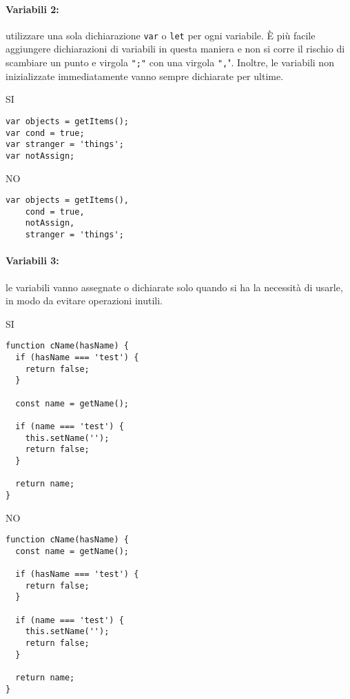 \documentclass[../ProcessiPrimari.tex]{subfiles}
\begin{document}
\paragraph{Variabili 2:}utilizzare una sola dichiarazione \texttt{var} o \texttt{let} per ogni variabile. È più facile aggiungere dichiarazioni di variabili in questa maniera e non si corre il rischio di scambiare un punto e virgola \texttt{";"} con una virgola \texttt{",}". Inoltre, le variabili non inizializzate immediatamente vanno sempre dichiarate per ultime.

\begin{center}{
\begin{minipage}{6cm}
	{\begin{center}SI\end{center}}
	\begin{Verbatim}[frame=single]
var objects = getItems();
var cond = true;
var stranger = 'things';
var notAssign;
	\end{Verbatim}
\end{minipage}
\hfil
\begin{minipage}{6.5cm}
	{\begin{center}NO\end{center}}
	\begin{Verbatim}[frame=single]
var objects = getItems(),
	cond = true,
	notAssign,
	stranger = 'things';
	\end{Verbatim}
\end{minipage}
}
\end{center}

\paragraph{Variabili 3:}le variabili vanno assegnate o dichiarate solo quando si ha la necessità di usarle, in modo da evitare operazioni inutili.
\begin{center}{
\begin{minipage}{6cm}
	{\begin{center}SI\end{center}}
	\begin{Verbatim}[frame=single]
function cName(hasName) {
  if (hasName === 'test') {
    return false;
  }

  const name = getName();

  if (name === 'test') {
    this.setName('');
    return false;
  }

  return name;
}
	\end{Verbatim}
\end{minipage}
\hfil
\begin{minipage}{6cm}
	{\begin{center}NO\end{center}}
	\begin{Verbatim}[frame=single]
function cName(hasName) {
  const name = getName();

  if (hasName === 'test') {
    return false;
  }

  if (name === 'test') {
    this.setName('');
    return false;
  }

  return name;
}	
\end{Verbatim}
\end{minipage}
}
\end{center}
\end{document}
